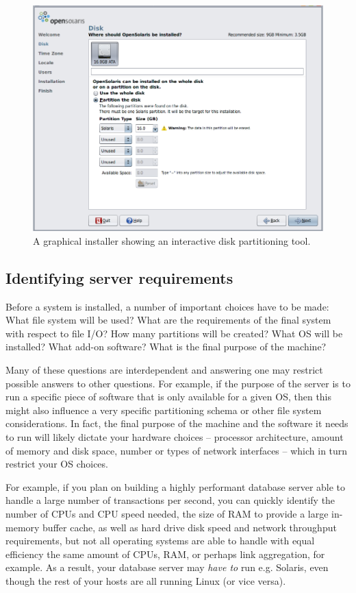 \begin{figure}[t]
	\centering
	\includegraphics[width=.85\textwidth]{05/pics/opensolaris-install}
		\caption[OpenSolaris Installation]{A graphical installer
			showing an interactive disk partitioning tool.
			\label{fig:os-installation:opensolaris}}
\end{figure}

\subsection{Identifying server requirements}
\label{software-installation:os-installation:requirements}

Before a system is installed, a number of important
choices have to be made: What file system will be
used?  What are the requirements of the final system
with respect to file I/O?  How many partitions will be
created?  What OS will be installed?  What add-on
software?  What is the final purpose of the machine?

Many of these questions are interdependent and
answering one may restrict possible answers to other
questions.  For example, if the purpose of the server
is to run a specific piece of software that is only
available for a given OS, then this might also
influence a very specific partitioning schema or other
file system considerations.  In fact, the final
purpose of the machine and the software it needs to
run will likely dictate your hardware choices --
processor architecture, amount of memory and disk
space, number or types of network interfaces -- which
in turn restrict your OS choices.

For example, if you plan on building a highly
performant database server able to handle a large
number of transactions per second, you can quickly
identify the number of CPUs and CPU speed needed, the
size of RAM to provide a large in-memory buffer cache,
as well as hard drive disk speed and network
throughput requirements, but not all operating systems
are able to handle with equal efficiency the same
amount of CPUs, RAM, or perhaps link
aggregation, for example.  As
a result, your database server may {\em have to} run
e.g. Solaris, even though the rest of your hosts are
all running Linux (or vice versa).

